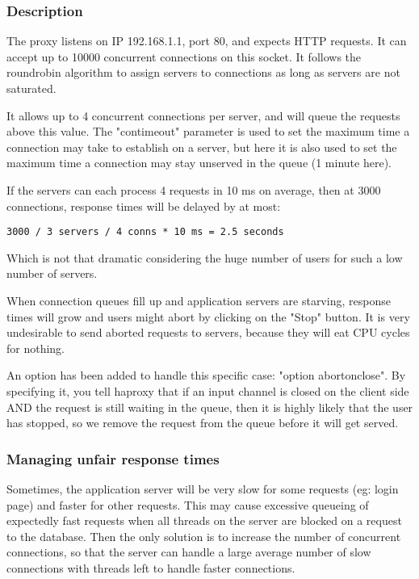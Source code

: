 \subsubsection{Description}

The proxy listens on IP 192.168.1.1, port 80, and expects HTTP requests. It
can accept up to 10000 concurrent connections on this socket. It follows the
roundrobin algorithm to assign servers to connections as long as servers are
not saturated.

It allows up to 4 concurrent connections per server, and will queue the
requests above this value. The "contimeout" parameter is used to set the
maximum time a connection may take to establish on a server, but here it
is also used to set the maximum time a connection may stay unserved in the
queue (1 minute here).

If the servers can each process 4 requests in 10 ms on average, then at 3000
connections, response times will be delayed by at most:

   \verb|3000 / 3 servers / 4 conns * 10 ms = 2.5 seconds|

Which is not that dramatic considering the huge number of users for such a low
number of servers.

When connection queues fill up and application servers are starving, response
times will grow and users might abort by clicking on the "Stop" button. It is
very undesirable to send aborted requests to servers, because they will eat
CPU cycles for nothing.

An option has been added to handle this specific case: "option abortonclose".
By specifying it, you tell haproxy that if an input channel is closed on the
client side AND the request is still waiting in the queue, then it is highly
likely that the user has stopped, so we remove the request from the queue
before it will get served.

\subsubsection{Managing unfair response times}

Sometimes, the application server will be very slow for some requests (eg:
login page) and faster for other requests. This may cause excessive queueing
of expectedly fast requests when all threads on the server are blocked on a
request to the database. Then the only solution is to increase the number of
concurrent connections, so that the server can handle a large average number
of slow connections with threads left to handle faster connections.

